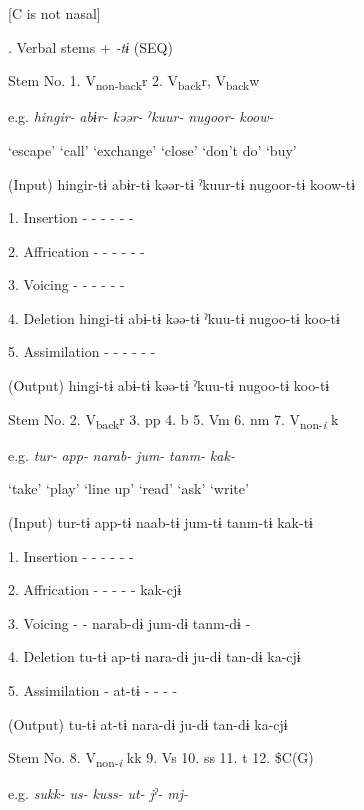     [C is not nasal]      

\begin{styleBeschriftung}
\textmd{. Verbal stems +} \textmd{\textit{{}-tɨ}}\textmd{ (SEQ)}
\end{styleBeschriftung}

Stem No.  1. V\textsubscript{non-back}r  2. V\textsubscript{back}r, V\textsubscript{back}w

  e.g.  \textit{hingir-}  \textit{abɨr-}  \textit{kəər-}  \textit{ˀkuur-}  \textit{nugoor-}  \textit{koow-}

    ‘escape’  ‘call’  ‘exchange’  ‘close’  ‘don’t do’  ‘buy’

  (Input)  hingir-tɨ  abɨr-tɨ  kəər-tɨ  ˀkuur-tɨ  nugoor-tɨ  koow-tɨ

1.  Insertion  {}-  {}-  {}-  {}-  {}-  {}-

2.  Affrication  {}-  {}-  {}-  {}-  {}-  {}-

3.  Voicing  {}-  {}-  {}-  {}-  {}-  {}-

4.  Deletion  hingi-tɨ  abɨ-tɨ  kəə-tɨ  ˀkuu-tɨ  nugoo-tɨ  koo-tɨ

5.  Assimilation  {}-  {}-  {}-  {}-  {}-  {}-

  (Output)  hingi-tɨ  abɨ-tɨ  kəə-tɨ  ˀkuu-tɨ  nugoo-tɨ  koo-tɨ

Stem No.  2. V\textsubscript{back}r  3. pp  4. b  5. Vm  6. nm  7. V\textsubscript{non-}\textit{\textsubscript{i} }k

  e.g.  \textit{tur-}  \textit{app-}  \textit{narab-}  \textit{jum-}  \textit{tanm-}  \textit{kak-}

    ‘take’  ‘play’  ‘line up’  ‘read’  ‘ask’  ‘write’

  (Input)  tur-tɨ  app-tɨ  naab-tɨ  jum-tɨ  tanm-tɨ  kak-tɨ

1.  Insertion  {}-  {}-  {}-  {}-  {}-  {}-

2.  Affrication  {}-  {}-  {}-  {}-  {}-  kak-cjɨ

3.  Voicing  {}-  {}-  narab-dɨ  jum-dɨ  tanm-dɨ  {}-

4.  Deletion  tu-tɨ  ap-tɨ  nara-dɨ  ju-dɨ  tan-dɨ  ka-cjɨ

5.  Assimilation  {}-  at-tɨ  {}-  {}-  {}-  {}-

  (Output)  tu-tɨ  at-tɨ  nara-dɨ  ju-dɨ  tan-dɨ  ka-cjɨ

  Stem No.  8. V\textsubscript{non-}\textit{\textsubscript{i} }kk  9. Vs  10. ss  11. t  12. \$C(G)

  e.g.  \textit{sukk-}  \textit{us-}  \textit{kuss-}  \textit{ut-}  \textit{jˀ-}  \textit{mj-}

